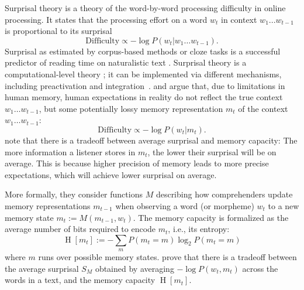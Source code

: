 \documentclass[man]{apa7}
\newcommand{\citep}{\parencite}
\newcommand{\citet}{\Textcite}
\newcommand\mhahn[1]{{\color{red}(#1)}}
\begin{document}
Surprisal theory \citep{hale2001probabilistic, levy2008expectation} is a theory of the word-by-word processing difficulty in online processing.
It states that the processing effort on a word $w_t$ in context $w_1 ... w_{t-1}$ is proportional to its surprisal
     \begin{equation}   \label{eq:true-surp}
    \text{Difficulty} \propto -\log P(w_t | w_1\dots w_{t-1}).
\end{equation}
Surprisal as estimated by corpus-based methods or cloze tasks is a successful predictor of reading time on naturalistic text \citep{smith2013effect,goodkind-predictive-2018,frank2019interaction,aurnhammer2019evaluating,wilcox2020predictive}. %
Surprisal theory is a computational-level theory \citep{marr-vision}; it can be implemented via different mechanisms, including preactivation and integration~\citep{kuperberg2016we}. 
\citet{futrell2020lossy} and \citet{Hahn2020modeling} argue that, due to limitations in human memory, human expectations in reality do not reflect the true context $w_1\dots w_{t-1}$, but some potentially lossy memory representation $m_t$ of the context $w_1\dots w_{t-1}$:
\begin{equation}   \label{eq:lossy-surp}
    \text{Difficulty} \propto -\log P(w_t | m_t).
\end{equation}
\citet{Hahn2020modeling} note that there is a tradeoff between average surprisal and memory capacity:
The more information a listener stores in $m_t$, the lower their surprisal will be on average.
This is because higher precision of memory leads to more precise expectations, which will achieve lower surprisal on average.

More formally, they consider functions $M$ describing how comprehenders update memory representations $m_{t-1}$ when observing a word (or morpheme) $w_t$ to a new memory state $m_t := M(m_{t-1}, w_t)$.
The memory capacity is formalized as the average number of bits required to encode $m_t$, i.e., its entropy:
\begin{equation*}
    \operatorname{H}[m_t] := - \sum_m P(m_t = m) \log_2 P(m_t=m)
\end{equation*}
where $m$ runs over possible memory states.
\citet{Hahn2020modeling} prove that there is a tradeoff between the average surprisal $S_M$ obtained by averaging $- \log P(w_t , m_t)$ across the words in a text, and the memory capacity $\operatorname{H}[m_t]$.

\end{document}
